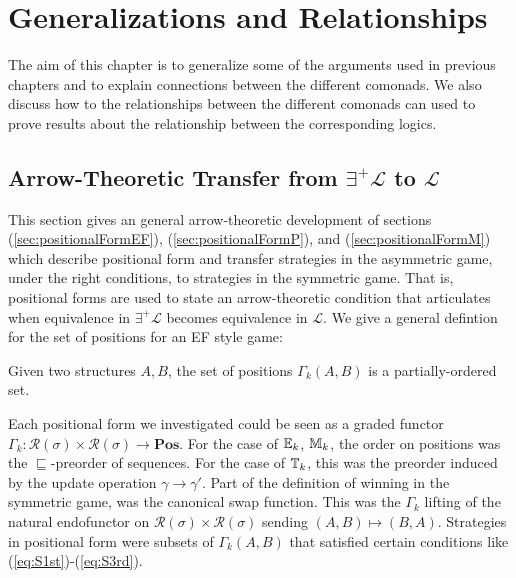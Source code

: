 \chapter{Generalizations and Relationships}
The aim of this chapter is to generalize some of the arguments used in previous chapters and to explain connections between the different comonads. We also discuss how to the relationships between the different comonads can used to prove results about the relationship between the corresponding logics. 
\section{Arrow-Theoretic Transfer from $\exists^{+}\mathcal{L}$ to $\mathcal{L}$}
This section gives an general arrow-theoretic development of sections (\ref{sec:positionalFormEF}), (\ref{sec:positionalFormP}), and (\ref{sec:positionalFormM}) which describe positional form and transfer strategies in the asymmetric game, under the right conditions, to strategies in the symmetric game. That is, positional forms are used to state an arrow-theoretic condition that articulates when equivalence in $\exists^{+}\mathcal{L}$ becomes equivalence in $\mathcal{L}$. We give a general defintion for the set of positions for an EF style game:
\begin{defn}
Given two structures $A,B$, the set of positions $\Gamma_{k}(A,B)$ is a partially-ordered set. 
\end{defn}
Each positional form we investigated could be seen as a graded functor $\Gamma_{k}:\mathcal{R}(\sigma) \times \mathcal{R}(\sigma) \longrightarrow \textbf{Pos}$. For the case of ${\mathbb{E}_{k}}$, ${\mathbb{M}_{k}}$, the order on positions was the $\sqsubseteq$-preorder of sequences. For the case of ${\mathbb{T}_{k}}$, this was the preorder induced by the update operation $\gamma \longrightarrow \gamma'$. Part of the definition of winning in the symmetric game, was the canonical swap function. This was the $\Gamma_{k}$ lifting of the natural endofunctor on $\mathcal{R}(\sigma) \times \mathcal{R}(\sigma)$ sending $(A,B) \mapsto (B,A)$. Strategies in positional form were subsets of $\Gamma_{k}(A,B)$ that satisfied certain conditions like (\ref{eq:S1st})-(\ref{eq:S3rd}). \\~\\
